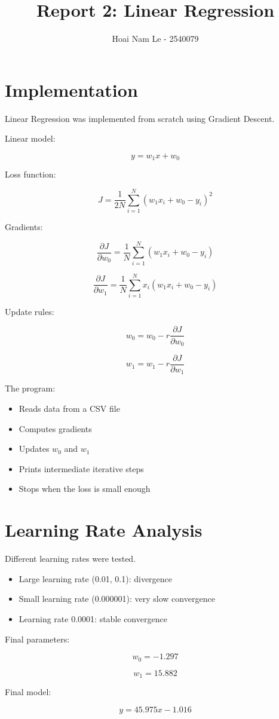 \documentclass{article}
\title{Report 2: Linear Regression}
\author{Hoai Nam Le - 2540079}
\begin{document}
\maketitle

\section{Implementation}

Linear Regression was implemented from scratch using Gradient Descent.

Linear model:

\[
y = w_1x + w_0
\]

Loss function:

\[
J = \frac{1}{2N}\sum_{i=1}^{N}(w_1x_i + w_0 - y_i)^2
\]

Gradients:

\[
\frac{\partial J}{\partial w_0}
=
\frac{1}{N}\sum_{i=1}^{N}(w_1x_i + w_0 - y_i)
\]

\[
\frac{\partial J}{\partial w_1}
=
\frac{1}{N}\sum_{i=1}^{N}x_i(w_1x_i + w_0 - y_i)
\]

Update rules:

\[
w_0 = w_0 - r\frac{\partial J}{\partial w_0}
\]

\[
w_1 = w_1 - r\frac{\partial J}{\partial w_1}
\]

The program:
\begin{itemize}
    \item Reads data from a CSV file
    \item Computes gradients
    \item Updates $w_0$ and $w_1$
    \item Prints intermediate iterative steps
    \item Stops when the loss is small enough
\end{itemize}

\section{Learning Rate Analysis}

Different learning rates were tested.

\begin{itemize}
    \item Large learning rate (0.01, 0.1): divergence
    \item Small learning rate (0.000001): very slow convergence
    \item Learning rate 0.0001: stable convergence
\end{itemize}

Final parameters:

\[
w_0 = -1.297
\]

\[
w_1 = 15.882
\]

Final model:

\[
y = 45.975x - 1.016
\]
\end{document}
